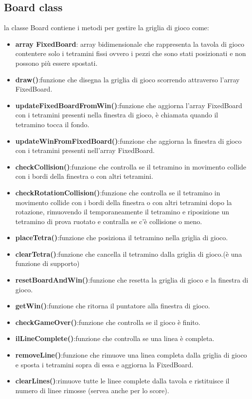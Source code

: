 \documentclass{article}
\begin{document}
\subsection{Board class}
la classe Board contiene i metodi per gestire la griglia di gioco come:
\begin{itemize}
    \item \textbf{array FixedBoard}: array bidimensionale che rappresenta la tavola di gioco contentere solo i tetramini fissi ovvero i pezzi che sono stati posizionati e non possono più essere spostati.
    \item \textbf{draw()}:funzione che disegna la griglia di gioco scorrendo attraverso l'array FixedBoard.
    \item \textbf{updateFixedBoardFromWin()}:funzione che aggiorna l'array FixedBoard con i tetramini presenti nella finestra di gioco, è chiamata quando il tetramino tocca il fondo.
    \item \textbf{updateWinFromFixedBoard()}:funzione che aggiorna la finestra di gioco con i tetramini presenti nell'array FixedBoard.
    \item \textbf{checkCollision()}:funzione che controlla se il tetramino in movimento collide con i bordi della finestra o con altri tetramini.
    \item \textbf{checkRotationCollision()}:funzione che controlla se il tetramino in movimento collide con i bordi della finestra o con altri tetramini dopo la rotazione, rimuovendo il temporaneamente il tetramino e riposizione un tetramino di prova ruotato e contralla se c'è collisione o meno.
    \item \textbf{placeTetra()}:funzione che posiziona il tetramino nella griglia di gioco.
    \item \textbf{clearTetra()}:funzione che cancella il tetramino dalla griglia di gioco.(è una funzione di supporto)
    \item \textbf{resetBoardAndWin()}:funzione che resetta la griglia di gioco e la finestra di gioco.
    \item \textbf{getWin()}:funzione che ritorna il puntatore alla finestra di gioco.
    \item \textbf{checkGameOver()}:funzione che controlla se il gioco è finito.
    \item \textbf{ilLineComplete()}:funzione che controlla se una linea è completa.
    \item \textbf{removeLine()}:funzione che rimuove una linea completa dalla griglia di gioco e sposta i tetramini sopra di essa e aggiorna la FixedBoard.
    \item \textbf{clearLines()}:rimuove tutte le linee complete dalla tavola e ristituisce il numero di linee rimosse (servea anche per lo score).
\end{itemize}
\end{document}
